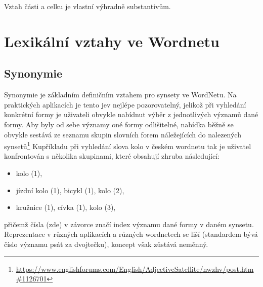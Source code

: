 \documentclass[a4paper, 11pt, oneside]{book}
\newcommand\ex{\textsf}
\begin{document}
					Vztah části a celku je vlastní výhradně substantivům.



			\section{Lexikální vztahy ve Wordnetu}

				\subsection{Synonymie}
				\label{cha:synon}

					Synonymie je základním definičním vztahem pro synsety ve WordNetu. Na praktických aplikacích je tento jev nejlépe pozorovatelný, jelikož při vyhledání konkrétní formy je uživateli obvykle nabídnut výběr z jednotlivých významů dané formy. Aby byly od sebe významy oné formy odlišitelné, nabídka běžně se obvykle sestává ze seznamu skupin slovních forem náležejících do nalezených synsetů\footnote{\url{https://www.englishforums.com/English/AdjectiveSatellite/nwzhv/post.htm#1126701}} Kupříkladu při vyhledání slova \ex{kolo} v českém wordnetu tak je uživatel konfrontován s několika skupinami, které obsahují zhruba následující:

					\begin{itemize}
						\item \ex{kolo (1)},
						\item \ex{jízdní kolo (1), bicykl (1), kolo (2)},
						\item \ex{kružnice (1), cívka (1), kolo (3)},
					\end{itemize}

					přičemž čísla (zde) v závorce značí index významu dané formy v daném synsetu. Reprezentace v různých aplikacích a různých wordnetech se liší (standardem bývá číslo významu psát za dvojtečku), koncept však zůstává neměnný. 
\end{document}
